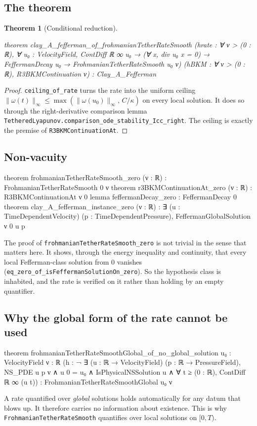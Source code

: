 \documentclass[11pt,a4paper]{article}
\newtheorem{theorem}{Theorem}[section]
\theoremstyle{definition}
\theoremstyle{remark}
\newcommand{\lean}[1]{\texttt{#1}}
\begin{document}
\subsection{The theorem}
\begin{theorem}[Conditional reduction]\label{thm:main}
\begin{leancode}
theorem clay_A_fefferman_of_frohmanianTetherRateSmooth
    (hrate : ∀ ν > (0 : ℝ), ∀ u₀ : VelocityField, ContDiff ℝ ∞ u₀ →
      (∀ x, div u₀ x = 0) → FeffermanDecay u₀ → FrohmanianTetherRateSmooth u₀ ν)
    (hBKM : ∀ ν > (0 : ℝ), R3BKMContinuation ν) :
    Clay_A_Fefferman
\end{leancode}
\end{theorem}
\begin{proof}
\lean{ceiling\_of\_rate} turns the rate into the uniform ceiling $\|\omega(t)\|_\infty\le\max(\|\omega(u_0)\|_\infty,\,C/\kappa)$ on every local solution. It does so through the right-derivative comparison lemma \lean{TetheredLyapunov.comparison\_ode\_stability\_Icc\_right}. The ceiling is exactly the premise of \lean{R3BKMContinuationAt}.
\end{proof}

\subsection{Non-vacuity}
\begin{leancode}
theorem frohmanianTetherRateSmooth_zero (ν : ℝ) : FrohmanianTetherRateSmooth 0 ν
theorem r3BKMContinuationAt_zero (ν : ℝ) : R3BKMContinuationAt ν 0
lemma feffermanDecay_zero : FeffermanDecay 0
theorem clay_A_fefferman_instance_zero (ν : ℝ) :
    ∃ (u : TimeDependentVelocity) (p : TimeDependentPressure),
      FeffermanGlobalSolution ν 0 u p
\end{leancode}
\noindent The proof of \lean{frohmanianTetherRateSmooth\_zero} is not trivial in the sense that matters here. It shows, through the energy inequality and continuity, that every local Fefferman-class solution from $0$ vanishes (\lean{eq\_zero\_of\_isFeffermanSolutionOn\_zero}). So the hypothesis class is inhabited, and the rate is verified on it rather than holding by an empty quantifier.

\subsection{Why the global form of the rate cannot be used}
\begin{leancode}
theorem frohmanianTetherRateSmoothGlobal_of_no_global_solution
    {u₀ : VelocityField} {ν : ℝ}
    (h : ¬ ∃ (u : ℝ → VelocityField) (p : ℝ → PressureField), NS_PDE u p ν ∧
      u 0 = u₀ ∧ IsPhysicalNSSolution u ∧ ∀ t ≥ (0 : ℝ), ContDiff ℝ ∞ (u t)) :
    FrohmanianTetherRateSmoothGlobal u₀ ν
\end{leancode}
A rate quantified over \emph{global} solutions holds automatically for any datum that blows up. It therefore carries no information about existence. This is why \lean{FrohmanianTetherRateSmooth} quantifies over local solutions on $[0,T)$.
\end{document}
